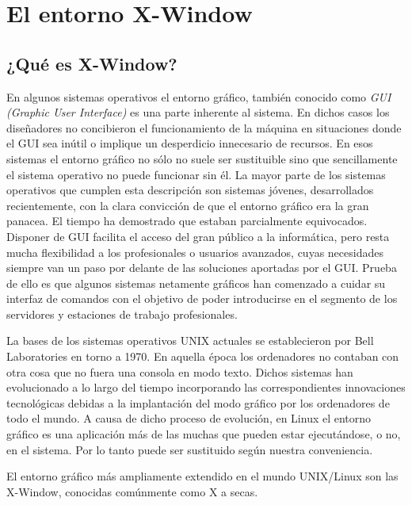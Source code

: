 
\chapter{El entorno X-Window}
\label{xwindow.tex}


\section{¿Qué es X-Window?} 

En algunos  sistemas operativos  el entorno gráfico,  también conocido
como  {\em  GUI  (Graphic  User Interface)}  es  una  parte
inherente al sistema.  En dichos casos los  diseñadores no concibieron
el funcionamiento de la máquina en situaciones donde el GUI sea inútil
o implique  un desperdicio innecesario  de recursos. En  esos sistemas
el  entorno  gráfico  no  sólo  no  suele  ser  sustituible  sino  que
sencillamente el sistema operativo no puede funcionar sin él. La mayor
parte  de los  sistemas operativos  que cumplen  esta descripción  son
sistemas jóvenes, desarrollados recientemente, con la clara convicción
de  que  el  entorno  gráfico  era  la  gran  panacea.  El  tiempo  ha
demostrado  que  estaban  parcialmente equivocados.  Disponer  de  GUI
facilita  el acceso  del gran  público  a la  informática, pero  resta
mucha flexibilidad  a los profesionales o  usuarios avanzados, cuyas
necesidades  siempre  van  un  paso  por  delante  de  las  soluciones
aportadas por el GUI. Prueba de ello es que algunos sistemas netamente
gráficos  han  comenzado a  cuidar  su  interfaz  de comandos  con  el
objetivo  de poder  introducirse en  el segmento  de los  servidores y
estaciones de trabajo profesionales.

La bases de los sistemas operativos UNIX actuales se establecieron por
Bell Laboratories en torno a 1970. En aquella época los ordenadores no
contaban con otra cosa que no  fuera una consola en modo texto. Dichos
sistemas  han evolucionado  a  lo largo  del  tiempo incorporando  las
correspondientes innovaciones  tecnológicas debidas a  la implantación
del modo  gráfico por  los ordenadores  de todo el  mundo. A  causa de
dicho  proceso  de evolución,  en  Linux  el  entorno gráfico  es  una
aplicación  más de  las muchas  que pueden  estar ejecutándose,  o no,
en  el  sistema. Por  lo  tanto  puede  ser sustituido  según  nuestra
conveniencia.

El entorno  gráfico más ampliamente  extendido en el  mundo UNIX/Linux
son las {\sf  X-Window}, conocidas comúnmente como  {\sf X} a
secas.

